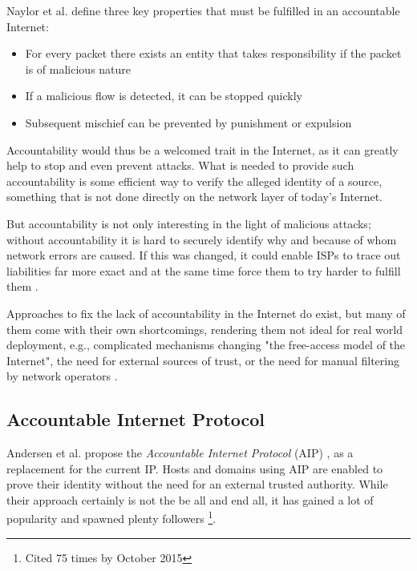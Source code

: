 \documentclass{acm_proc_article-sp}
\begin{document}
Naylor et al. \cite{apip} define three key properties that must be fulfilled in an accountable Internet:

\begin{itemize}
\item For every packet there exists an entity that takes responsibility if the packet is of malicious nature
\item If a malicious flow is detected, it can be stopped quickly
\item Subsequent mischief can be prevented by punishment or expulsion
\end{itemize}

Accountability would thus be a welcomed trait in the Internet, as it can greatly help to stop and even prevent attacks. What is needed to provide such accountability is some efficient way to verify the alleged identity of a source, something that is not done directly on the network layer of today's Internet. 

But accountability is not only interesting in the light of malicious attacks; without accountability it is hard to securely identify why and because of whom network errors are caused. If this was changed, it could enable ISPs to trace out liabilities far more exact and at the same time force them to try harder to fulfill them \cite{mot}. 

Approaches to fix the lack of accountability in the Internet do exist, but many of them come with their own shortcomings, rendering them not ideal for real world deployment, e.g., complicated mechanisms changing "the free-access model of the Internet", the need for external sources of trust, or the need for manual filtering by network operators \cite{aip}. 


\subsection{Accountable Internet Protocol}
\label{sec:aip}
Andersen et al. propose the \emph{Accountable Internet Protocol} (AIP) \cite{aip}, as a replacement for the current IP. Hosts and domains using AIP are enabled to prove their identity without the need for an external trusted authority. While their approach certainly is not the be all and end all, it has gained a lot of popularity and spawned plenty followers \footnote{Cited 75 times by October 2015}.
\end{document}
